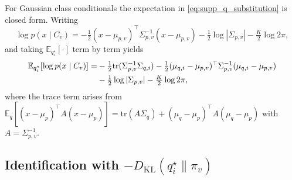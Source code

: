 \documentclass[twoside,11pt]{article}
\begin{document}
For Gaussian class conditionals the expectation in \eqref{eq:supp_q_substitution} is closed form. Writing
\[
\log p(x \mid C_v) = -\tfrac{1}{2}(x - \mu_{p,v})^{\top} \Sigma_{p,v}^{-1} (x - \mu_{p,v}) - \tfrac{1}{2}\log|\Sigma_{p,v}| - \tfrac{K}{2}\log 2\pi,
\]
and taking $\mathbb{E}_{q_i^{\star}}[\cdot]$ term by term yields
\begin{align}
\mathbb{E}_{q_i^{\star}}[\log p(x \mid C_v)]
= & -\tfrac{1}{2} \mathrm{tr}(\Sigma_{p,v}^{-1} \Sigma_{q,i})
- \tfrac{1}{2} (\mu_{q,i} - \mu_{p,v})^{\top} \Sigma_{p,v}^{-1} (\mu_{q,i} - \mu_{p,v}) \notag \\
& - \tfrac{1}{2}\log|\Sigma_{p,v}| - \tfrac{K}{2}\log 2\pi,
\label{eq:supp_expected_loglik}
\end{align}
where the trace term arises from $\mathbb{E}_q[(x-\mu_p)^{\top} A (x-\mu_p)] = \mathrm{tr}(A \Sigma_q) + (\mu_q-\mu_p)^{\top} A (\mu_q-\mu_p)$ with $A = \Sigma_{p,v}^{-1}$.

\subsection{Identification with $-D_{\mathrm{KL}}(q_i^{\star} \| \pi_v)$}
\end{document}
